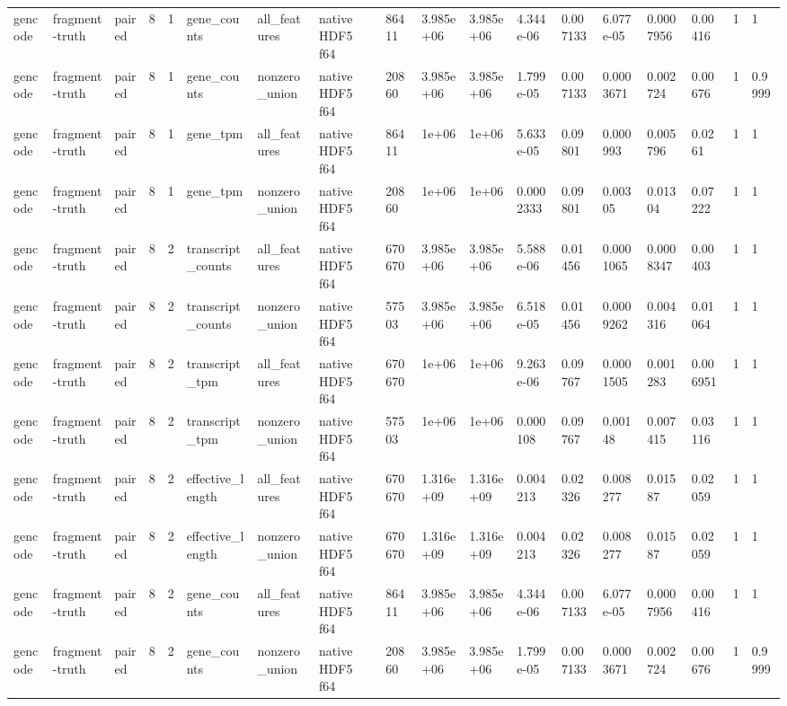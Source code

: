 \begin{tabular}{llllllllllllllllll}
gencode & fragment-truth & paired & 8 & 1 & gene\_counts & all\_features & native HDF5 f64 & 86411 & 3.985e+06 & 3.985e+06 & 4.344e-06 & 0.007133 & 6.077e-05 & 0.0007956 & 0.00416 & 1 & 1 \\
gencode & fragment-truth & paired & 8 & 1 & gene\_counts & nonzero\_union & native HDF5 f64 & 20860 & 3.985e+06 & 3.985e+06 & 1.799e-05 & 0.007133 & 0.0003671 & 0.002724 & 0.00676 & 1 & 0.9999 \\
gencode & fragment-truth & paired & 8 & 1 & gene\_tpm & all\_features & native HDF5 f64 & 86411 & 1e+06 & 1e+06 & 5.633e-05 & 0.09801 & 0.000993 & 0.005796 & 0.0261 & 1 & 1 \\
gencode & fragment-truth & paired & 8 & 1 & gene\_tpm & nonzero\_union & native HDF5 f64 & 20860 & 1e+06 & 1e+06 & 0.0002333 & 0.09801 & 0.00305 & 0.01304 & 0.07222 & 1 & 1 \\
gencode & fragment-truth & paired & 8 & 2 & transcript\_counts & all\_features & native HDF5 f64 & 670670 & 3.985e+06 & 3.985e+06 & 5.588e-06 & 0.01456 & 0.0001065 & 0.0008347 & 0.00403 & 1 & 1 \\
gencode & fragment-truth & paired & 8 & 2 & transcript\_counts & nonzero\_union & native HDF5 f64 & 57503 & 3.985e+06 & 3.985e+06 & 6.518e-05 & 0.01456 & 0.0009262 & 0.004316 & 0.01064 & 1 & 1 \\
gencode & fragment-truth & paired & 8 & 2 & transcript\_tpm & all\_features & native HDF5 f64 & 670670 & 1e+06 & 1e+06 & 9.263e-06 & 0.09767 & 0.0001505 & 0.001283 & 0.006951 & 1 & 1 \\
gencode & fragment-truth & paired & 8 & 2 & transcript\_tpm & nonzero\_union & native HDF5 f64 & 57503 & 1e+06 & 1e+06 & 0.000108 & 0.09767 & 0.00148 & 0.007415 & 0.03116 & 1 & 1 \\
gencode & fragment-truth & paired & 8 & 2 & effective\_length & all\_features & native HDF5 f64 & 670670 & 1.316e+09 & 1.316e+09 & 0.004213 & 0.02326 & 0.008277 & 0.01587 & 0.02059 & 1 & 1 \\
gencode & fragment-truth & paired & 8 & 2 & effective\_length & nonzero\_union & native HDF5 f64 & 670670 & 1.316e+09 & 1.316e+09 & 0.004213 & 0.02326 & 0.008277 & 0.01587 & 0.02059 & 1 & 1 \\
gencode & fragment-truth & paired & 8 & 2 & gene\_counts & all\_features & native HDF5 f64 & 86411 & 3.985e+06 & 3.985e+06 & 4.344e-06 & 0.007133 & 6.077e-05 & 0.0007956 & 0.00416 & 1 & 1 \\
gencode & fragment-truth & paired & 8 & 2 & gene\_counts & nonzero\_union & native HDF5 f64 & 20860 & 3.985e+06 & 3.985e+06 & 1.799e-05 & 0.007133 & 0.0003671 & 0.002724 & 0.00676 & 1 & 0.9999 \\

\end{tabular}
